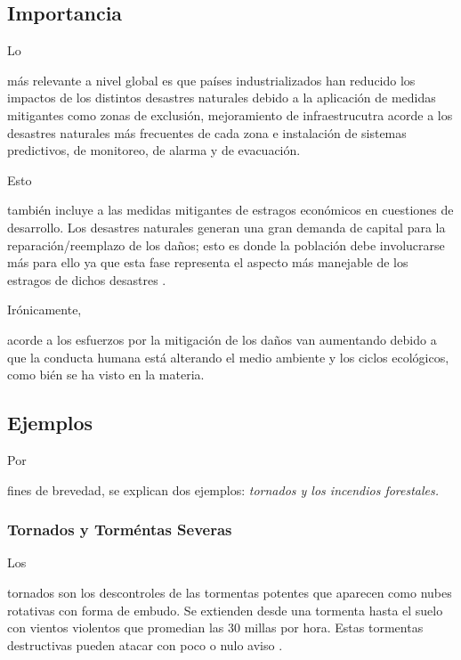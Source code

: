 \documentclass[stu, 12pt, letterpaper, donotrepeattitle, floatsintext, natbib]{apa7}
\begin{document}
\subsection{Importancia}
Lo \begin{justifying}
    más relevante a nivel global es que países industrializados han reducido los impactos
    de los distintos desastres naturales debido a la aplicación de medidas mitigantes como zonas 
    de exclusión, mejoramiento de infraestrucutra acorde a los desastres naturales más frecuentes
    de cada zona e instalación de sistemas predictivos, de monitoreo, de alarma y de evacuación.\par
\end{justifying}
Esto \begin{justifying}
    también incluye a las medidas mitigantes de estragos económicos en cuestiones de desarrollo. Los
    desastres naturales generan una gran demanda de capital para la reparación/reemplazo de los daños;
    esto es donde la población debe involucrarse más para ello ya que esta fase representa el aspecto más manejable
    de los estragos de dichos desastres \citep{unknown-author-no-dateB}.\par %
\end{justifying}
Irónicamente, \begin{justifying}
    acorde a \cite{RME529} %
    los esfuerzos por la mitigación de los daños van aumentando debido a que la conducta humana
    está alterando el medio ambiente y los ciclos ecológicos, como bién se ha visto en la materia.\par %
\end{justifying}
\vspace{\baselineskip}
\subsection{Ejemplos}
Por \begin{justifying}
    fines de brevedad, se explican dos ejemplos: \emph{tornados y los incendios forestales.}\par
\end{justifying}
\subsubsection{Tornados y Torméntas Severas}
Los \begin{justifying}
    tornados son los descontroles de las tormentas potentes que aparecen como nubes rotativas con forma de embudo.
    Se extienden desde una tormenta hasta el suelo con vientos violentos que promedian las 30 millas por hora. Estas
    tormentas destructivas pueden atacar con poco o nulo aviso \citep{unknown-author-no-dateC}.\par %
\end{justifying}
\vspace{\baselineskip}
\end{document}
